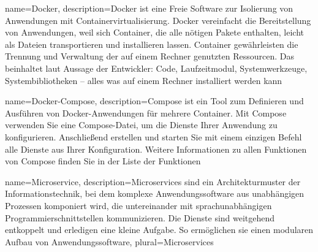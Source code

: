 {
    name=Docker,
    description={Docker ist eine Freie Software zur Isolierung von Anwendungen mit Containervirtualisierung. Docker vereinfacht die Bereitstellung von Anwendungen, weil sich Container, die alle nötigen Pakete enthalten, leicht als Dateien transportieren und installieren lassen. Container gewährleisten die Trennung und Verwaltung der auf einem Rechner genutzten Ressourcen. Das beinhaltet laut Aussage der Entwickler: Code, Laufzeitmodul, Systemwerkzeuge, Systembibliotheken – alles was auf einem Rechner installiert werden kann}
}

{
    name=Docker-Compose,
    description={Compose ist ein Tool zum Definieren und Ausführen von Docker-Anwendungen für mehrere Container. Mit Compose verwenden Sie eine Compose-Datei, um die Dienste Ihrer Anwendung zu konfigurieren. Anschließend erstellen und starten Sie mit einem einzigen Befehl alle Dienste aus Ihrer Konfiguration. Weitere Informationen zu allen Funktionen von Compose finden Sie in der Liste der Funktionen}
}

{
    name=Microservice,
    description={Microservices sind ein Architekturmuster der Informationstechnik, bei dem komplexe Anwendungssoftware aus unabhängigen Prozessen komponiert wird, die untereinander mit sprachunabhängigen Programmierschnittstellen kommunizieren. Die Dienste sind weitgehend entkoppelt und erledigen eine kleine Aufgabe. So ermöglichen sie einen modularen Aufbau von Anwendungssoftware},
    plural={Microservices}
}


